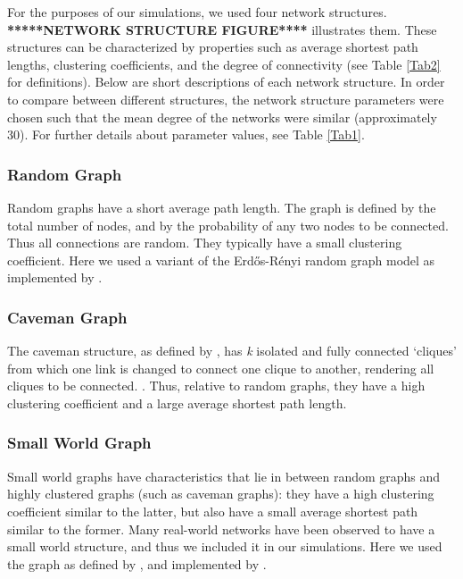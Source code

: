 For the purposes of our simulations, we used four network structures. \textbf{*****NETWORK STRUCTURE FIGURE****} illustrates them. These structures can be characterized by properties such as average shortest path lengths, clustering coefficients, and the degree of connectivity (see Table \ref{Tab2}  for definitions). Below are short descriptions of each network structure. In order to compare between different structures, the network structure parameters were chosen such that the mean degree of the networks were similar (approximately 30). For further details about parameter values, see Table \ref{Tab1}.



\subsubsection{Random Graph}

Random graphs have a short average path length. The graph is defined by the total number of nodes, and by the probability of any two nodes to be connected. Thus all connections are random. They typically have a small clustering coefficient. Here we used a variant of the Erd\H{o}s-R\'enyi random graph model \citep*{ER1960} as implemented by \citet*{BS2011}.

\subsubsection{Caveman Graph}

The caveman structure, as defined by \citet*{W2003}, has \emph{k} isolated and fully connected `cliques' from which one link is changed to connect one clique to another, rendering all cliques to be connected.
. Thus, relative to random graphs, they have a high clustering coefficient and a large average shortest path length.

\subsubsection{Small World Graph}

Small world graphs have characteristics that lie in between random graphs and highly clustered graphs (such as caveman graphs): they have a high clustering coefficient similar to the latter, but also have a small average shortest path similar to the former. Many real-world networks have been observed to have a small world structure, and thus we included it in our simulations. Here we used the graph as defined by \citet*{WS1998}, and implemented by \citet*{BS2011}.

